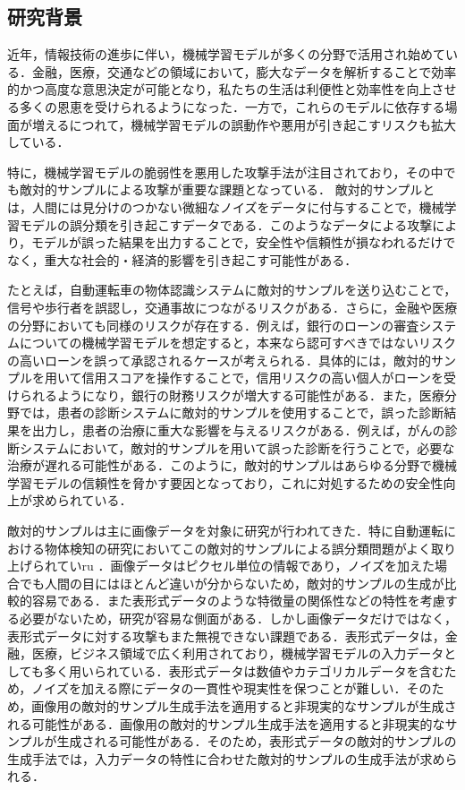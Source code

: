 \subsection{研究背景}
近年，情報技術の進歩に伴い，機械学習モデルが多くの分野で活用され始めている．金融，医療，交通などの領域において，膨大なデータを解析することで効率的かつ高度な意思決定が可能となり，私たちの生活は利便性と効率性を向上させる多くの恩恵を受けられるようになった．一方で，これらのモデルに依存する場面が増えるにつれて，機械学習モデルの誤動作や悪用が引き起こすリスクも拡大している．

特に，機械学習モデルの脆弱性を悪用した攻撃手法が注目されており，その中でも敵対的サンプルによる攻撃が重要な課題となっている\cite{MBSD-AdversarialTraining}．
敵対的サンプルとは，人間には見分けのつかない微細なノイズをデータに付与することで，機械学習モデルの誤分類を引き起こすデータである\cite{MBSD-AdversarialExample}．このようなデータによる攻撃により，モデルが誤った結果を出力することで，安全性や信頼性が損なわれるだけでなく，重大な社会的・経済的影響を引き起こす可能性がある．

たとえば，自動運転車の物体認識システムに敵対的サンプルを送り込むことで，信号や歩行者を誤認し，交通事故につながるリスクがある\cite{AdversarialMachineLearning:BayesianPerspectives}．さらに，金融や医療の分野においても同様のリスクが存在する．例えば，銀行のローンの審査システムについての機械学習モデルを想定すると，本来なら認可すべきではないリスクの高いローンを誤って承認されるケースが考えられる．具体的には，敵対的サンプルを用いて信用スコアを操作することで，信用リスクの高い個人がローンを受けられるようになり，銀行の財務リスクが増大する可能性がある．また，医療分野では，患者の診断システムに敵対的サンプルを使用することで，誤った診断結果を出力し，患者の治療に重大な影響を与えるリスクがある．例えば，がんの診断システムにおいて，敵対的サンプルを用いて誤った診断を行うことで，必要な治療が遅れる可能性がある．このように，敵対的サンプルはあらゆる分野で機械学習モデルの信頼性を脅かす要因となっており，これに対処するための安全性向上が求められている．

敵対的サンプルは主に画像データを対象に研究が行われてきた．特に自動運転における物体検知の研究においてこの敵対的サンプルによる誤分類問題がよく取り上げられていru
\cite{MBSD-automobile}．画像データはピクセル単位の情報であり，ノイズを加えた場合でも人間の目にはほとんど違いが分からないため，敵対的サンプルの生成が比較的容易である．また表形式データのような特徴量の関係性などの特性を考慮する必要がないため，研究が容易な側面がある．しかし画像データだけではなく，表形式データに対する攻撃もまた無視できない課題である．表形式データは，金融，医療，ビジネス領域で広く利用されており，機械学習モデルの入力データとしても多く用いられている．表形式データは数値やカテゴリカルデータを含むため，ノイズを加える際にデータの一貫性や現実性を保つことが難しい．そのため，画像用の敵対的サンプル生成手法を適用すると非現実的なサンプルが生成される可能性がある．画像用の敵対的サンプル生成手法を適用すると非現実的なサンプルが生成される可能性がある．そのため，表形式データの敵対的サンプルの生成手法では，入力データの特性に合わせた敵対的サンプルの生成手法が求められる．

